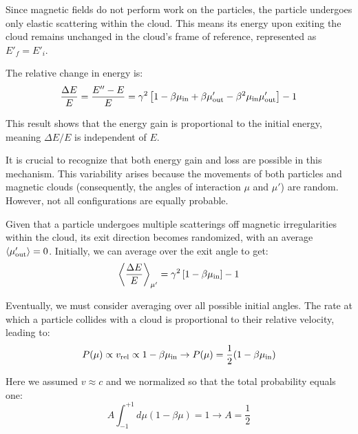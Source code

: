 Since magnetic fields do not perform work on the particles, the particle undergoes only elastic scattering within the cloud. This means its energy upon exiting the cloud remains unchanged in the cloud's frame of reference, represented as \( E'_f = E'_i \).

The relative change in energy is:
%
\begin{equation}
\frac{\Delta E}{E} = \frac{E'' - E}{E} =
\gamma^2  \left[ 1 - \beta \mu_{\rm in} + \beta \mu^\prime_{\rm out} - \beta^2 \mu_{\rm in} \mu^\prime_{\rm out} \right] - 1
\end{equation}

This result shows that the energy gain is proportional to the initial energy, meaning \( \Delta E/E \) is independent of \( E \).

It is crucial to recognize that both energy gain and loss are possible in this mechanism. This variability arises because the movements of both particles and magnetic clouds (consequently, the angles of interaction \( \mu \) and \( \mu' \)) are random. 
%
However, not all configurations are equally probable.

Given that a particle undergoes multiple scatterings off magnetic irregularities within the cloud, its exit direction becomes randomized, with an average \( \langle \mu'_{\rm out} \rangle = 0 \). Initially, we can average over the exit angle to get:
%
\begin{equation}
\left\langle \frac{\Delta E}{E} \right\rangle_{\mu^\prime} = 
\gamma^2 \left[ 1 - \beta \mu_{\rm in} \right] - 1
\end{equation}

Eventually, we must consider averaging over all possible initial angles. The rate at which a particle collides with a cloud is proportional to their relative velocity, leading to:
%
\begin{equation}
P(\mu) \propto v_{\rm{rel}} \propto 1 - \beta \mu_{\rm in} \rightarrow P(\mu) = \frac{1}{2} (1 - \beta \mu_{\rm in})
\end{equation}

Here we assumed \( v \approx c \) and we normalized so that the total probability equals one:
%
\begin{equation}
A \int_{-1}^{+1} d\mu (1 - \beta \mu) = 1 \rightarrow A = \frac{1}{2}
\end{equation}

